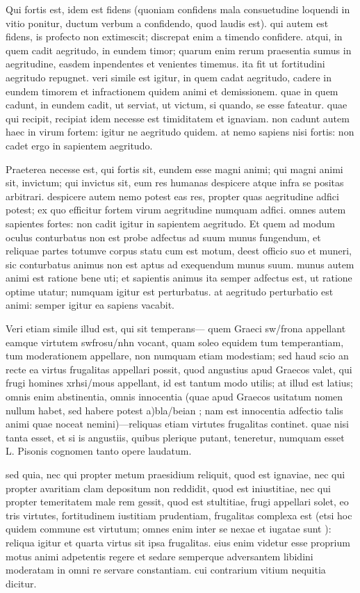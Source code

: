  Qui fortis est, idem est fidens (quoniam confidens mala consuetudine loquendi in vitio ponitur, ductum verbum a confidendo, quod laudis est). qui autem est fidens, is profecto non extimescit; discrepat enim a timendo confidere. atqui, in quem cadit aegritudo, in eundem timor; quarum enim rerum praesentia sumus in aegritudine, easdem inpendentes et venientes timemus. ita fit ut fortitudini aegritudo repugnet. veri simile est igitur, in quem cadat aegritudo, cadere in eundem timorem et infractionem quidem animi et demissionem. quae in quem cadunt, in eundem cadit, ut serviat, ut victum, si quando, se esse fateatur. quae qui recipit, recipiat idem necesse est timiditatem et ignaviam. non cadunt autem haec in virum fortem: igitur ne aegritudo quidem. at nemo sapiens nisi fortis: non cadet ergo in sapientem aegritudo.

 Praeterea necesse est, qui fortis sit, eundem esse magni animi; qui magni animi sit, invictum; qui invictus sit, eum res humanas despicere atque infra se positas arbitrari. despicere autem nemo potest eas res, propter quas aegritudine adfici potest; ex quo efficitur fortem virum aegritudine numquam adfici. omnes autem sapientes fortes: non cadit igitur in sapientem aegritudo. Et quem ad modum oculus conturbatus non est probe adfectus ad suum munus fungendum, et reliquae partes totumve corpus statu cum est motum, deest officio suo et muneri, sic conturbatus animus non est aptus ad exequendum munus suum. munus autem animi est ratione bene uti; et sapientis animus ita semper adfectus est, ut ratione optime utatur; numquam igitur est perturbatus. at aegritudo perturbatio est animi: semper igitur ea sapiens vacabit.

 Veri etiam simile illud est, qui sit temperans— quem Graeci sw/frona appellant eamque virtutem swfrosu/nhn vocant, quam soleo equidem tum temperantiam, tum moderationem appellare, non numquam etiam modestiam; sed haud scio an recte ea virtus frugalitas appellari possit, quod angustius apud Graecos valet, qui frugi homines xrhsi/mous appellant, id est tantum modo utilis; at illud est latius; omnis enim abstinentia, omnis innocentia (quae apud Graecos usitatum nomen nullum habet, sed habere potest a)bla/beian ; nam est innocentia adfectio talis animi quae noceat nemini)—reliquas etiam virtutes frugalitas continet. quae nisi tanta esset, et si is angustiis, quibus plerique putant, teneretur, numquam esset L. Pisonis cognomen tanto opere laudatum.

 sed quia, nec qui propter metum praesidium reliquit, quod est ignaviae, nec qui propter avaritiam clam depositum non reddidit, quod est iniustitiae, nec qui propter temeritatem male rem gessit, quod est stultitiae, frugi appellari solet, eo tris virtutes, fortitudinem iustitiam prudentiam, frugalitas complexa est (etsi hoc quidem commune est virtutum; omnes enim inter se nexae et iugatae sunt ): reliqua igitur et quarta virtus sit ipsa frugalitas. eius enim videtur esse proprium motus animi adpetentis regere et sedare semperque adversantem libidini moderatam in omni re servare constantiam. cui contrarium vitium nequitia dicitur.

